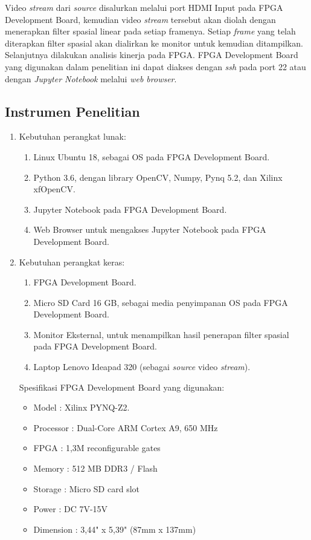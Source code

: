 Video \textit{stream} dari \textit{source} disalurkan melalui port HDMI Input pada FPGA Development Board, kemudian video \textit{stream} tersebut akan diolah dengan menerapkan filter spasial linear pada setiap framenya. Setiap \textit{frame} yang telah diterapkan filter spasial akan dialirkan ke monitor untuk kemudian ditampilkan. Selanjutnya dilakukan analisis kinerja pada FPGA. FPGA Development Board yang digunakan dalam penelitian ini dapat diakses dengan \textit{ssh} pada port 22 atau dengan \textit{Jupyter Notebook} melalui \textit{web browser}.

\subsection{Instrumen Penelitian}
\begin{enumerate}[topsep=0pt,itemsep=0pt,partopsep=0pt, parsep=0pt]
    \item Kebutuhan perangkat lunak:
    \begin{enumerate}[topsep=0pt,itemsep=0pt,partopsep=0pt, parsep=0pt, label={\alph*.}]
        \item Linux Ubuntu 18, sebagai OS pada FPGA Development Board.
        \item Python 3.6, dengan library OpenCV, Numpy, Pynq 5.2, dan Xilinx xfOpenCV.
        \item Jupyter Notebook pada FPGA Development Board. 
        \item Web Browser untuk mengakses Jupyter Notebook pada FPGA Development Board.
    \end{enumerate}
    \item Kebutuhan perangkat keras:
    \begin{enumerate}[topsep=0pt,itemsep=0pt,partopsep=0pt, parsep=0pt, label={\alph*.}]
        \item FPGA Development Board.
        \item Micro SD Card 16 GB, sebagai media penyimpanan OS pada FPGA Development Board.
        \item Monitor Eksternal, untuk menampilkan hasil penerapan filter spasial pada FPGA Development Board.
        \item Laptop Lenovo Ideapad 320 (sebagai \textit{source} video \textit{stream}).
    \end{enumerate}

    Spesifikasi FPGA Development Board yang digunakan:
    \begin{itemize}[topsep=0pt,itemsep=0pt,partopsep=0pt, parsep=0pt]
        \item Model : Xilinx PYNQ-Z2.
        \item Processor : Dual-Core ARM Cortex A9, 650 MHz
        \item FPGA : 1,3M reconfigurable gates
        \item Memory : 512 MB DDR3 / Flash
        \item Storage : Micro SD card slot
        \item Power : DC 7V-15V
        \item Dimension : 3,44" x 5,39" (87mm x 137mm)
    \end{itemize}
\end{enumerate}


